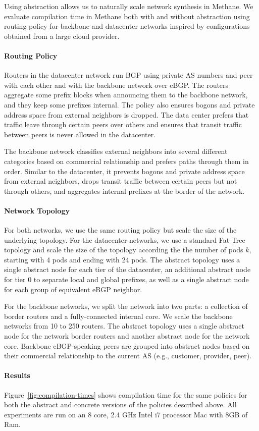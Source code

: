 \documentclass{sig-alternate-10pt}
\newcommand{\sysname}{{\small \sf Methane}\xspace}
\newcommand{\para}[1]{\paragraph*{\textbf{#1}}}
\begin{document}
Using abstraction allows us to naturally scale network synthesis in \sysname. We evaluate compilation time in \sysname both with and without abstraction using routing policy for backbone and datacenter networks inspired by configurations obtained from a large cloud provider.

\para{Routing Policy}

Routers in the datacenter network run BGP using private AS numbers and peer with each other and with the backbone network over eBGP. The routers aggregate some prefix blocks when announcing them to the backbone network, and they keep some prefixes internal. The policy also ensures bogons and private address space from external neighbors is dropped. The data center prefers that traffic leave through certain peers over others and ensures that transit traffic between peers is never allowed in the datacenter.

The backbone network classifies external neighbors into several different categories based on commercial relationship and prefers paths through them in order. Similar to the datacenter, it prevents bogons and private address space from external neighbors, drops transit traffic between certain peers but not through others, and aggregates internal prefixes at the border of the network.

\para{Network Topology}

For both networks, we use the same routing policy but scale the size of the underlying topology. For the datacenter networks, we use a standard Fat Tree topology and scale the size of the topology according the the number of pods $k$, starting with 4 pods and ending with 24 pods. The abstract topology uses a single abstract node for each tier of the datacenter, an additional abstract node for tier 0 to separate local and global prefixes, as well as a single abstract node for each group of equivalent eBGP neighbor.

For the backbone networks, we split the network into two parts: a collection of border routers and a fully-connected internal core. We scale the backbone networks from 10 to 250 routers. The abstract topology uses a single abstract node for the network border routers and another abstract node for the network core. Backbone eBGP-speaking peers are grouped into abstract nodes based on their commercial relationship to the current AS (e.g., customer, provider, peer).

\para{Results}

Figure~\ref{fig:compilation-times} shows compilation time for the same policies for both the abstract and concrete versions of the policies described above. All experiments are run on an 8 core, 2.4 GHz Intel i7 processor Mac with 8GB of Ram.
\end{document}
